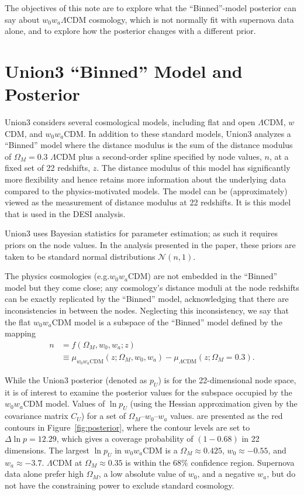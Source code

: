 \documentclass[11pt,a4paper]{article}
\begin{document}
The objectives of this note are to explore what the ``Binned''-model posterior can say about $w_0w_a\Lambda$CDM cosmology, which is not normally
fit with  supernova data alone,
and to explore how the posterior changes with a different prior. 

\section{Union3 ``Binned'' Model and Posterior}
Union3 considers several cosmological models, including  flat and open $\Lambda$CDM, $w$CDM, and $w_0w_a$CDM.
In addition to these standard models,  Union3 analyzes a ``Binned'' model where the  distance modulus
is the sum of the distance modulus of $\Omega_M=0.3$  $\Lambda$CDM plus a second-order spline specified by node values, $n$,
at a fixed set of 22 redshifts, $z$.  The distance modulus of this model has significantly more flexibility 
and hence retains more information about the underlying data compared to the physics-motivated models.
The model can be (approximately) viewed as the measurement of distance modulus at 22 redshifts.
It is this model that is used in the DESI analysis.

Union3 uses Bayesian statistics for parameter estimation; as such it requires 
priors on the node values. In the analysis presented in the paper, these priors are taken to be standard normal distributions
$\mathcal{N}(n,1)$.

The physics cosmologies (e.g.$w_0w_a$CDM)  are not embedded in the ``Binned'' model but 
they come close; any cosmology's distance moduli at the node redshifts can be exactly replicated by the ``Binned'' model, acknowledging that
there are
inconsistencies in between the nodes.  Neglecting this inconsistency, we say that the flat $w_0w_a$CDM model
is a subspace of the ``Binned'' model defined by the mapping
\begin{align}
	n &= f(\Omega_M, w_0, w_a; z) \\
	& \equiv \mu_{w_0 w_a \text{CDM}}(z;\Omega_M, w_0, w_a)  - \mu_{\Lambda \text{CDM}}(z;\Omega_M=0.3).
\end{align}

While the Union3 posterior (denoted as $p_U$) is for the 22-dimensional node space, it is of interest to examine the posterior values for the
subspace occupied by the $w_0w_a$CDM
model. 
Values of $\ln{p_U}$ (using the Hessian approximation given by the covariance matrix $C_U$) for a
set of $\Omega_M$--$w_0$--$w_a$ values.
 are presented as the red contours in Figure~\ref{fig:posterior}, where the contour levels are set to $\Delta \ln{p}=12.29$, which gives
a coverage probability of $(1-0.68)$ in 22 dimensions.
The largest $\ln{p_U}$ in $w_0w_a$CDM is a $\Omega_M\approx 0.425$, $w_0 \approx -0.55$, and $w_a \approx -3.7$. $\Lambda$CDM at $\Omega_M \approx 0.35$ is within the 68\% confidence region.
Supernova data alone prefer high $\Omega_M$, a low absolute value of $w_0$, and a negative $w_a$, but do not have
the constraining power to exclude standard cosmology.
\end{document}
